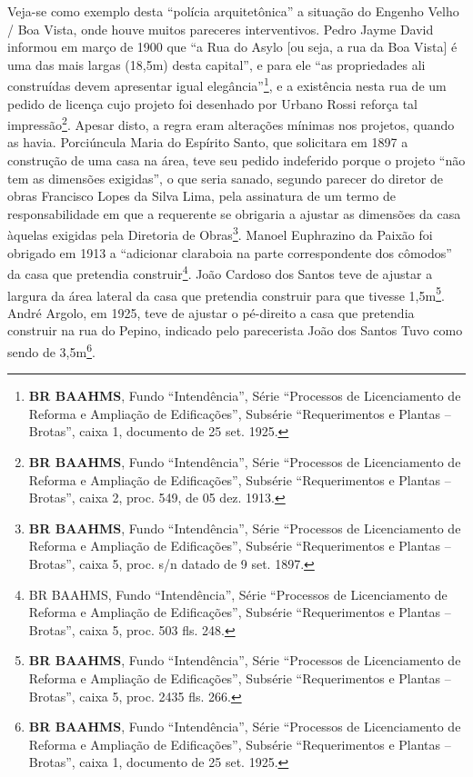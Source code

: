 Veja-se como exemplo desta ``polícia arquitetônica'' a situação do Engenho Velho / Boa Vista, onde houve muitos pareceres interventivos. Pedro Jayme David informou em março de 1900 que ``a Rua do Asylo [ou seja, a rua da Boa Vista] é uma das mais largas (18,5m) desta capital'', e para ele ``as propriedades ali construídas devem apresentar igual elegância''\footnote{\textbf{BR BAAHMS}, Fundo ``Intendência'', Série ``Processos de Licenciamento de Reforma e Ampliação de Edificações'', Subsérie ``Requerimentos e Plantas – Brotas'', caixa 1, documento de 25 set. 1925.}, e a existência nesta rua de um pedido de licença cujo projeto foi desenhado por Urbano Rossi reforça tal impressão\footnote{\textbf{BR BAAHMS}, Fundo ``Intendência'', Série ``Processos de Licenciamento de Reforma e Ampliação de Edificações'', Subsérie ``Requerimentos e Plantas – Brotas'', caixa 2, proc. 549, de 05 dez. 1913.}. Apesar disto, a regra eram alterações mínimas nos projetos, quando as havia. Porciúncula Maria do Espírito Santo, que solicitara em 1897 a construção de uma casa na área, teve seu pedido indeferido porque o projeto ``não tem as dimensões exigidas'', o que seria sanado, segundo parecer do diretor de obras Francisco Lopes da Silva Lima, pela assinatura de um termo de responsabilidade em que a requerente se obrigaria a ajustar as dimensões da casa àquelas exigidas pela Diretoria de Obras\footnote{\textbf{BR BAAHMS}, Fundo ``Intendência'', Série ``Processos de Licenciamento de Reforma e Ampliação de Edificações'', Subsérie ``Requerimentos e Plantas – Brotas'', caixa 5, proc. s/n datado de 9 set. 1897.}. Manoel Euphrazino da Paixão foi obrigado em 1913 a ``adicionar claraboia na parte correspondente dos cômodos'' da casa que pretendia construir\footnote{BR BAAHMS, Fundo ``Intendência'', Série ``Processos de Licenciamento de Reforma e Ampliação de Edificações'', Subsérie ``Requerimentos e Plantas – Brotas'', caixa 5, proc. 503 fls. 248.}. João Cardoso dos Santos teve de ajustar a largura da área lateral da casa que pretendia construir para que tivesse 1,5m\footnote{\textbf{BR BAAHMS}, Fundo ``Intendência'', Série ``Processos de Licenciamento de Reforma e Ampliação de Edificações'', Subsérie ``Requerimentos e Plantas – Brotas'', caixa 5, proc. 2435 fls. 266.}. André Argolo, em 1925, teve de ajustar o pé-direito a casa que pretendia construir na rua do Pepino, indicado pelo parecerista João dos Santos Tuvo como sendo de 3,5m\footnote{\textbf{BR BAAHMS}, Fundo ``Intendência'', Série ``Processos de Licenciamento de Reforma e Ampliação de Edificações'', Subsérie ``Requerimentos e Plantas – Brotas'', caixa 1, documento de 25 set. 1925.}. 

